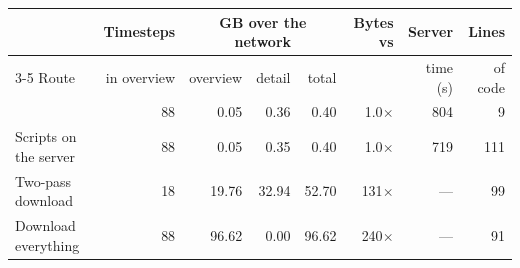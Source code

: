 \begin{tabular}{@{}lrrrrrrr@{}}
\toprule
 & Timesteps & \multicolumn{3}{c}{GB over the network} & Bytes vs & Server & Lines \\
\cmidrule(lr){3-5}
Route & in overview & overview & detail & total & \Sname{} & time (s) & of code \\
\midrule
\Sname{} & 88 & 0.05 & 0.36 & 0.40 & 1.0$\times$ & 804 & 9 \\
Scripts on the server & 88 & 0.05 & 0.35 & 0.40 & 1.0$\times$ & 719 & 111 \\
Two-pass download & 18 & 19.76 & 32.94 & 52.70 & 131$\times$ & --- & 99 \\
Download everything & 88 & 96.62 & 0.00 & 96.62 & 240$\times$ & --- & 91 \\
\bottomrule
\end{tabular}

